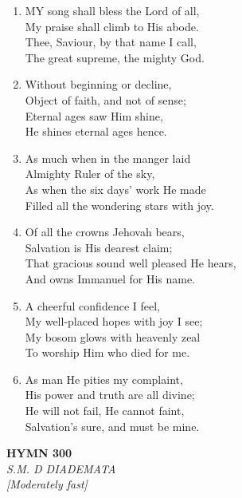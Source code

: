 \documentclass[11pt,a4paper]{article}
\begin{document}
\begin{enumerate}
    \item MY song shall bless the Lord of all, \\
        My praise shall climb to His abode. \\
        Thee, Saviour, by that name I call, \\
        The great supreme, the mighty God.

    \item Without beginning or decline, \\
        Object of faith, and not of sense; \\
        Eternal ages saw Him shine, \\
        He shines eternal ages hence.

    \item As much when in the manger laid \\
        Almighty Ruler of the sky, \\
        As when the six days' work He made \\
        Filled all the wondering stars with joy.

    \item Of all the crowns Jehovah bears, \\
        Salvation is His dearest claim; \\
        That gracious sound well pleased He hears, \\
        And owns Immanuel for His name.

    \item A cheerful confidence I feel, \\
        My well-placed hopes with joy I see; \\
        My bosom glows with heavenly zeal \\
        To worship Him who died for me.

    \item As man He pities my complaint, \\
        His power and truth are all divine; \\
        He will not fail, He cannot faint, \\
        Salvation's sure, and must be mine.

\end{enumerate}

\newpage
\begin{center}
    {\Large \textbf{HYMN 300}}
    \\
    \textit{S.M. D DIADEMATA}
    \\
    \textit{\small [Moderately fast]}
\end{center}
\vspace{1em}
\end{document}
